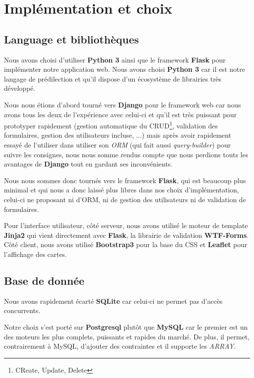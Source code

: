 \documentclass[10pt,a4paper]{article}
\begin{document}
\section{Implémentation et choix}
\subsection{Language et bibliothèques}

Nous avons choisi d'utiliser \textbf{Python 3} ainsi que le framework \textbf{Flask} pour implémenter notre application web. Nous avons choisi \textbf{Python 3} car il est notre langage de prédilection et qu'il dispose d'un écosystème de librairies très développé.

Nous nous étions d'abord tourné vers \textbf{Django} pour le framework web car nous avons tous les deux de l'expérience avec celui-ci et qu'il est très puissant pour prototyper rapidement (gestion automatique du CRUD\footnote{CReate, Update, Delete}, validation des formulaires, gestion des utilisateurs incluse, ...) mais après avoir rapidement essayé de l'utiliser dans utiliser son \textit{ORM} (qui fait aussi \textit{query-builder}) pour suivre les consignes, nous nous somme rendus compte que nous perdions touts les avantages de \textbf{Django} tout en gardant ses inconvénients.

Nous nous sommes donc tournés vers le framework \textbf{Flask}, qui est beaucoup plus minimal et qui nous a donc laissé plus libres dans nos choix d'implémentation, celui-ci ne proposant ni d'ORM, ni de gestion des utilisateurs ni de validation de formulaires.

Pour l'interface utilisateur, côté serveur, nous avons utilisé le moteur de template \textbf{Jinja2} qui vient directement avec \textbf{Flask}, la librairie de validation \textbf{WTF-Forms}. Côté client, nous avons utilisé \textbf{Bootstrap3} pour la base du CSS et \textbf{Leaflet} pour l'affichage des cartes.

\subsection{Base de donnée}

Nous avons rapidement écarté \textbf{SQLite} car celui-ci ne permet pas d'accès concurrents.

Notre choix s'est porté sur \textbf{Postgresql} plutôt que \textbf{MySQL} car le premier est un des moteurs les plus complets, puissants et rapides du marché. De plus, il permet, contrairement à MySQL, d'ajouter des contraintes et il supporte les \textit{ARRAY}.
\end{document}
